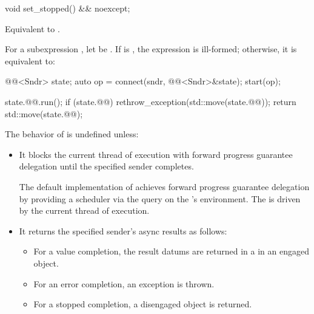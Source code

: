 \begin{itemdecl}
void set_stopped() && noexcept;
\end{itemdecl}

\begin{itemdescr}
\pnum
\effects
Equivalent to .
\end{itemdescr}

\pnum
For a subexpression , let  be .
If 
is ,
the expression  is ill-formed;
otherwise, it is equivalent to:
\begin{codeblock}
@@<Sndr> state;
auto op = connect(sndr, @@<Sndr>{&state});
start(op);

state.@@.run();
if (state.@@) {
  rethrow_exception(std::move(state.@@));
}
return std::move(state.@@);
\end{codeblock}

\pnum
The behavior of  is undefined unless:
\begin{itemize}
\item
It blocks the current thread of execution
with forward progress guarantee delegation
until the specified sender completes.
\begin{note}
The default implementation of  achieves
forward progress guarantee delegation by providing a  scheduler
via the  query
on the 's environment.
The  is driven by the current thread of execution.
\end{note}
\item
It returns the specified sender's async results as follows:
\begin{itemize}
\item
For a value completion,
the result datums are returned in
a  in an engaged  object.
\item
For an error completion, an exception is thrown.
\item
For a stopped completion, a disengaged  object is returned.
\end{itemize}
\end{itemize}

